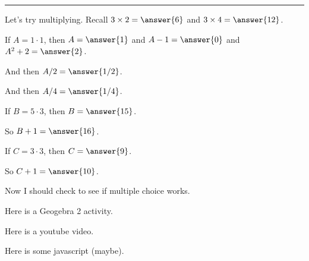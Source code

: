\documentclass{ximera}
\begin{document}
\hrule

\begin{problem}
  Let's try multiplying.  Recall $3 \times 2 = \answer{6}$ and $3 \times 4 = \answer{12}$.
  
  \begin{problem}
    If $A = 1 \cdot 1$, then $A = \answer{1}$ and $A - 1 = \answer{0}$ and $A^2 + 2= \answer{2}$.
    
    \begin{problem}
      And then $A/2 = \answer{1/2}$.
      
      \begin{problem}
        And then $A/4 = \answer{1/4}$.
      \end{problem}
    \end{problem}
  \end{problem}
  
  \begin{problem}
    If $B = 5 \cdot 3$, then $B = \answer{15}$.
    
    \begin{problem}
      So $B + 1 = \answer{16}$.
    \end{problem}
  \end{problem}
  
  \begin{problem}
    If $C = 3 \cdot 3$, then $C = \answer{9}$.
    
    \begin{problem}
      So $C + 1 = \answer{10}$.
    \end{problem}
  \end{problem}
  
\end{problem}

Now I should check to see if multiple choice works.

Here is a Geogebra 2 activity.


Here is a youtube video.


Here is some javascript (maybe).
\end{document}
